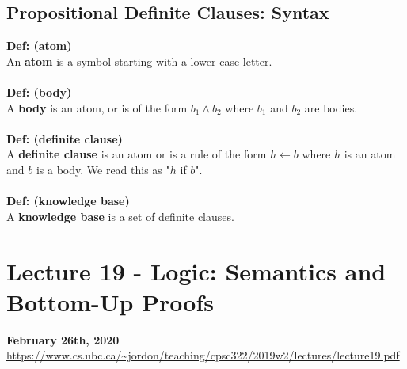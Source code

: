 \documentclass{article}
\def\blu#1{{\color{blu}#1}}
\begin{document}
\subsection*{Propositional Definite Clauses: Syntax}
\textbf{Def: (atom)} \\
An \blu{\textbf{atom}} is a symbol starting with a lower case letter. \\
\\
\textbf{Def: (body)}\\
A \textbf{\blu{body}} is an atom, or is of the form $ b_1 \land b_2 $ where $ b_1 $ and $ b_2 $ are bodies. \\
\\
\textbf{Def: (definite clause)}\\
A \textbf{\blu{definite clause}} is an atom or is a rule of the form $ h \leftarrow b $ where $ h $ is an atom and $ b $ is a body. We read this as "$ h $ if $ b $".\\
\\
\textbf{Def: (knowledge base)}\\
A \textbf{\blu{knowledge base}} is a set of definite clauses.

\newpage

\section*{Lecture 19 - Logic: Semantics and Bottom-Up Proofs}
\textbf{February 26th, 2020}\\
\url{https://www.cs.ubc.ca/~jordon/teaching/cpsc322/2019w2/lectures/lecture19.pdf}\\
\end{document}
